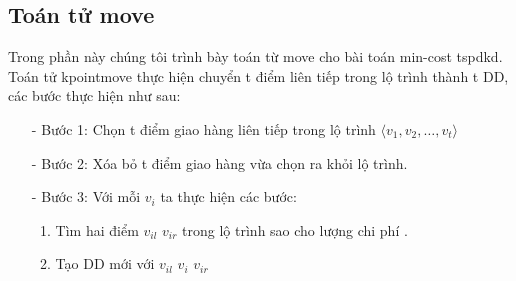 \documentclass[a4paper,12pt]{report}
\begin{document}
\subsection{Toán tử move}
Trong phần này chúng tôi trình bày toán từ move cho bài toán min-cost tspdkd.\\

Toán tử kpointmove thực hiện chuyển t điểm liên tiếp trong lộ trình thành t DD, các bước thực hiện như sau: 
\begin{itemize}
\item[-] Bước 1: Chọn t điểm giao hàng liên tiếp trong lộ trình $\langle v_1,v_2,\ldots,v_t \rangle$
\item[-] Bước 2: Xóa bỏ t điểm giao hàng vừa chọn ra khỏi lộ trình.
\item[-] Bước 3: Với mỗi $v_i$ ta thực hiện các bước: 
\begin{enumerate}
\item Tìm hai điểm $v_{il}$ $v_{ir}$ trong lộ trình sao cho lượng chi phí .
\item Tạo DD mới với $v_{il}$ $v_{i}$ $v_{ir}$
\end{enumerate}
\end{itemize}
\end{document}
